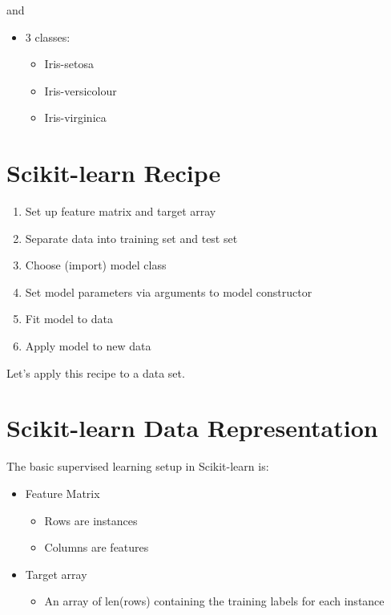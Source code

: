 \documentclass[11pt]{article}
\begin{document}
and

\begin{itemize}
\item 3 classes:
\begin{itemize}
\item Iris-setosa
\item Iris-versicolour
\item Iris-virginica
\end{itemize}
\end{itemize}
\section{Scikit-learn Recipe}
\label{sec:orga0e01bc}

\begin{enumerate}
\item Set up feature matrix and target array
\item Separate data into training set and test set
\item Choose (import) model class
\item Set model parameters via arguments to model constructor
\item Fit model to data
\item Apply model to new data
\end{enumerate}

Let's apply this recipe to a data set.
\section{Scikit-learn Data Representation}
\label{sec:org59ddf42}

The basic supervised learning setup in Scikit-learn is:

\begin{itemize}
\item Feature Matrix

\begin{itemize}
\item Rows are instances
\item Columns are features
\end{itemize}

\item Target array

\begin{itemize}
\item An array of len(rows) containing the training labels for each instance
\end{itemize}
\end{itemize}
\end{document}
